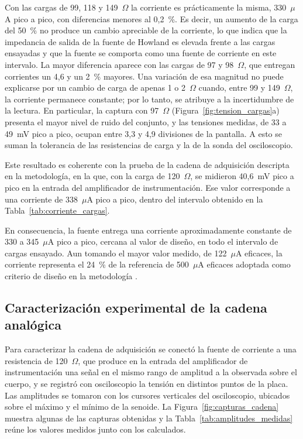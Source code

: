 \documentclass[12pt,a4paper]{article}
\begin{document}
Con las cargas de 99, 118 y 149~$\Omega$ la corriente es prácticamente la misma, 330~$\mu$A pico a
pico, con diferencias menores al 0,2~\%. Es decir, un aumento de la carga del 50~\% no produce un
cambio apreciable de la corriente, lo que indica que la impedancia de salida de la fuente de Howland
es elevada frente a las cargas ensayadas y que la fuente se comporta como una fuente de corriente
en este intervalo. La mayor diferencia aparece con las cargas de 97 y 98~$\Omega$, que entregan
corrientes un 4,6 y un 2~\% mayores. Una variación de esa magnitud no puede explicarse por un cambio
de carga de apenas 1 o 2~$\Omega$ cuando, entre 99 y 149~$\Omega$, la corriente permanece constante;
por lo tanto, se atribuye a la incertidumbre de la lectura. En particular, la captura con 97~$\Omega$
(Figura~\ref{fig:tension_cargas}a) presenta el mayor nivel de ruido del conjunto, y las tensiones
medidas, de 33 a 49~mV pico a pico, ocupan entre 3,3 y 4,9 divisiones de la pantalla. A esto se
suman la tolerancia de las resistencias de carga y la de la sonda del osciloscopio.

Este resultado es coherente con la prueba de la cadena de adquisición descripta en la metodología,
en la que, con la carga de 120~$\Omega$, se midieron 40,6~mV pico a pico en la entrada del
amplificador de instrumentación. Ese valor corresponde a una corriente de 338~$\mu$A pico a pico,
dentro del intervalo obtenido en la Tabla~\ref{tab:corriente_cargas}.

En consecuencia, la fuente entrega una corriente aproximadamente constante de 330 a 345~$\mu$A
pico a pico, cercana al valor de diseño, en todo el intervalo de cargas ensayado. Aun tomando el
mayor valor medido, de 122~$\mu$A eficaces, la corriente representa el 24~\% de la referencia de
500~$\mu$A eficaces adoptada como criterio de diseño en la metodología \cite{analog_an1557}.

\subsection{Caracterización experimental de la cadena analógica}

Para caracterizar la cadena de adquisición se conectó la fuente de corriente a una resistencia de
120~$\Omega$, que produce en la entrada del amplificador de instrumentación una señal en el mismo 
rango de amplitud a la observada sobre el cuerpo, y se registró con osciloscopio la
tensión en distintos puntos de la placa. Las amplitudes se tomaron con los cursores verticales
del osciloscopio, ubicados sobre el máximo y el mínimo de la senoide. La
Figura~\ref{fig:capturas_cadena} muestra algunas de las capturas obtenidas y la
Tabla~\ref{tab:amplitudes_medidas} reúne los valores medidos junto con los calculados.
\end{document}
